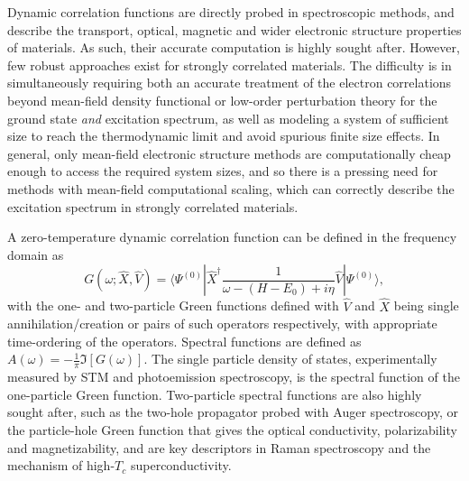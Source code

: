 \documentclass[aps,twocolumn,nobibnotes]{revtex4}
\begin{document}
Dynamic correlation functions are directly probed in spectroscopic methods,
and describe the transport, optical, magnetic and wider electronic structure properties of materials. 
As such, their accurate computation is highly sought after. 
However, few robust approaches exist for strongly correlated materials\cite{Gali2013}. The difficulty is in simultaneously requiring both an accurate 
treatment of the electron correlations beyond mean-field density functional or low-order perturbation theory for the ground state {\em and} excitation spectrum, as well as modeling 
a system of sufficient size to reach the thermodynamic limit and avoid spurious finite size effects. 
In general, only mean-field electronic structure methods are computationally cheap enough to access the required system
sizes, and so there is a pressing need for methods with mean-field computational scaling, which can correctly describe 
the excitation spectrum in strongly correlated materials.

A zero-temperature dynamic correlation function can be defined in the frequency domain as
\begin{equation}
    G(\omega;{\hat X},{\hat V}) = \langle \Psi^{(0)} | {\hat X}^{\dagger} \frac{1}{\omega-(H-E_0)+i \eta} {\hat V} | \Psi^{(0)} \rangle , \label{eqn:intCorrFunc}
\end{equation}
with the one- and two-particle Green functions defined with ${\hat V}$ and ${\hat X}$ being single annihilation/creation or pairs of such operators 
respectively, with appropriate time-ordering of the operators. Spectral functions are defined as $A(\omega)=-\frac{1}{\pi}\Im[G(\omega)]$.
The single particle
density of states, experimentally measured by STM 
and photoemission spectroscopy, is the spectral function of the one-particle Green function. 
Two-particle spectral functions are also highly sought after, such as the two-hole propagator 
probed with Auger spectroscopy\cite{Mona2013}, or the particle-hole Green function that gives the optical conductivity, polarizability and
magnetizability, and are key descriptors in 
Raman spectroscopy and the mechanism of high-$T_c$ superconductivity\cite{Millis2012,Sordi2012,Millis2013}.
\end{document}
